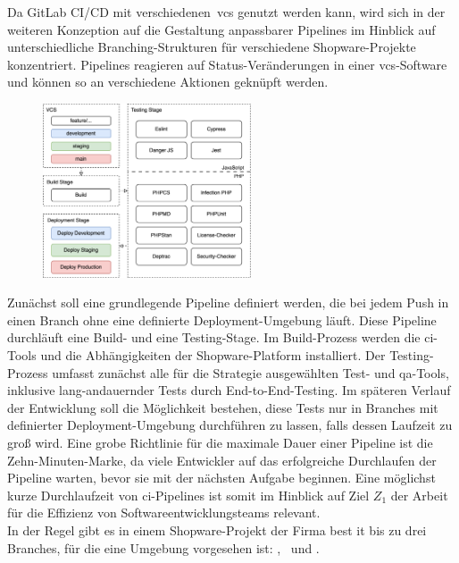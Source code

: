 Da GitLab CI/CD mit verschiedenen\ \acrshort{vcs} genutzt werden kann, wird sich in der weiteren Konzeption auf die
Gestaltung anpassbarer Pipelines im Hinblick auf unterschiedliche Branching-Strukturen für verschiedene
Shopware-Projekte konzentriert.
Pipelines reagieren auf Status-Veränderungen in einer \acrshort{vcs}-Software und können so an verschiedene
Aktionen geknüpft werden.
\begin{figure}
    \centering
    \includegraphics[width=0.55\textwidth]{images/content/ci-pipeline-concept}
    \label{fig:ci-pipeline-concept}
\end{figure}
Zunächst soll eine grundlegende Pipeline definiert werden, die bei jedem Push in einen Branch ohne eine definierte
Deployment-Umgebung läuft.
Diese Pipeline durchläuft eine Build- und eine Testing-Stage.
Im Build-Prozess werden die \acrshort{ci}-Tools und die Abhängigkeiten der Shopware-Platform installiert.
Der Testing-Prozess umfasst zunächst alle für die Strategie ausgewählten Test- und \acrshort{qa}-Tools, inklusive
lang-andauernder Tests durch End-to-End-Testing.
Im späteren Verlauf der Entwicklung soll die Möglichkeit bestehen, diese Tests nur in Branches mit definierter
Deployment-Umgebung durchführen zu lassen, falls dessen Laufzeit zu groß wird.
Eine grobe Richtlinie für die maximale Dauer einer Pipeline ist die Zehn-Minuten-Marke, da viele Entwickler
auf das erfolgreiche Durchlaufen der Pipeline warten, bevor sie mit der nächsten Aufgabe beginnen.
Eine möglichst kurze Durchlaufzeit von \acrshort{ci}-Pipelines ist somit im Hinblick auf Ziel $Z_1$ der Arbeit für die
Effizienz von Softwareentwicklungsteams relevant.\\
In der Regel gibt es in einem Shopware-Projekt der Firma best it bis zu drei Branches, für die eine Umgebung vorgesehen
ist: ,\  und .
